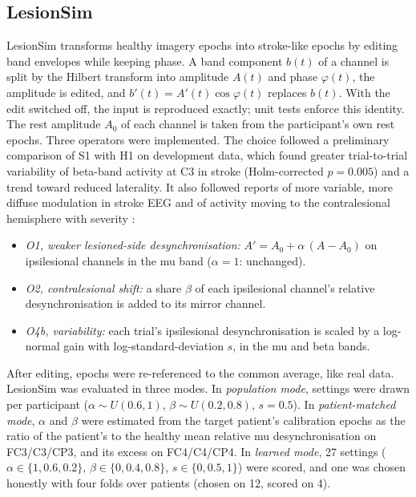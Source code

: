 \documentclass[11pt]{article}
\begin{document}
\subsection{LesionSim}
\label{sec:lesionsim-method}

LesionSim transforms healthy imagery epochs into stroke-like epochs by editing band envelopes while keeping phase. A band component $b(t)$ of a channel is split by the Hilbert transform into amplitude $A(t)$ and phase $\varphi(t)$, the amplitude is edited, and $b'(t) = A'(t)\cos\varphi(t)$ replaces $b(t)$. With the edit switched off, the input is reproduced exactly; unit tests enforce this identity. The rest amplitude $A_0$ of each channel is taken from the participant's own rest epochs. Three operators were implemented. The choice followed a preliminary comparison of S1 with H1 on development data, which found greater trial-to-trial variability of beta-band activity at C3 in stroke (Holm-corrected $p = 0.005$) and a trend toward reduced laterality. It also followed reports of more variable, more diffuse modulation in stroke EEG \citep{via2026} and of activity moving to the contralesional hemisphere with severity \citep{mansour2022}:
\begin{itemize}
  \item \emph{O1, weaker lesioned-side desynchronisation:} $A' = A_0 + \alpha\,(A - A_0)$ on ipsilesional channels in the mu band ($\alpha = 1$: unchanged).
  \item \emph{O2, contralesional shift:} a share $\beta$ of each ipsilesional channel's relative desynchronisation is added to its mirror channel.
  \item \emph{O4b, variability:} each trial's ipsilesional desynchronisation is scaled by a log-normal gain with log-standard-deviation $s$, in the mu and beta bands.
\end{itemize}
After editing, epochs were re-referenced to the common average, like real data. LesionSim was evaluated in three modes. In \emph{population mode}, settings were drawn per participant ($\alpha \sim U(0.6, 1)$, $\beta \sim U(0.2, 0.8)$, $s = 0.5$). In \emph{patient-matched mode}, $\alpha$ and $\beta$ were estimated from the target patient's calibration epochs as the ratio of the patient's to the healthy mean relative mu desynchronisation on FC3/C3/CP3, and its excess on FC4/C4/CP4. In \emph{learned mode}, 27 settings ($\alpha \in \{1, 0.6, 0.2\}$, $\beta \in \{0, 0.4, 0.8\}$, $s \in \{0, 0.5, 1\}$) were scored, and one was chosen honestly with four folds over patients (chosen on 12, scored on 4).
\end{document}
